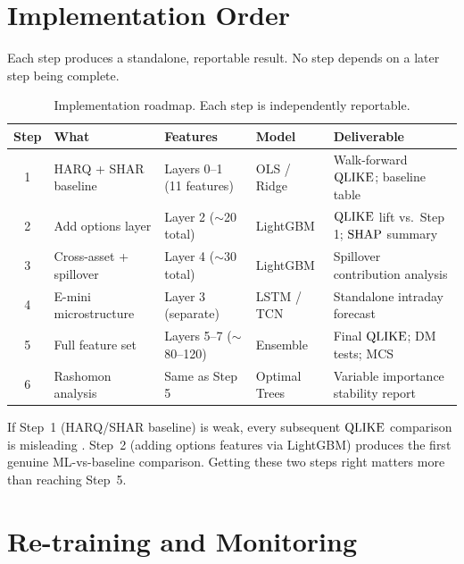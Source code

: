 \section{Implementation Order}
\label{sec:impl-order}

Each step produces a standalone, reportable result.
No step depends on a later step being complete.

\begin{table}[htbp]
\centering
\caption{Implementation roadmap. Each step is independently reportable.}
\label{tab:impl-order}
\small
\begin{tabular}{@{}clp{2.4cm}lp{3.4cm}@{}}
\toprule
\textbf{Step} & \textbf{What} & \textbf{Features} & \textbf{Model} & \textbf{Deliverable} \\
\midrule
1 & HARQ + SHAR baseline & Layers 0--1 (11 features) & OLS / Ridge & Walk-forward $\operatorname{QLIKE}$; baseline table \\
2 & Add options layer & Layer 2 ($\sim$20 total) & LightGBM & $\operatorname{QLIKE}$ lift vs.\ Step 1; $\operatorname{SHAP}$ summary \\
3 & Cross-asset + spillover & Layer 4 ($\sim$30 total) & LightGBM & Spillover contribution analysis \\
4 & E-mini microstructure & Layer 3 (separate) & LSTM / TCN & Standalone intraday forecast \\
5 & Full feature set & Layers 5--7 ($\sim$80--120) & Ensemble & Final $\operatorname{QLIKE}$; DM tests; MCS \\
6 & Rashomon analysis & Same as Step 5 & Optimal Trees & Variable importance stability report \\
\bottomrule
\end{tabular}
\end{table}

\begin{keyidea}
If Step~1 (HARQ/SHAR baseline) is weak, every subsequent $\operatorname{QLIKE}$ comparison is misleading \citep{HARdToBeat2024}.
Step~2 (adding options features via LightGBM) produces the first genuine ML-vs-baseline comparison.
Getting these two steps right matters more than reaching Step~5.
\end{keyidea}


\section{Re-training and Monitoring}
\label{sec:retrain}

